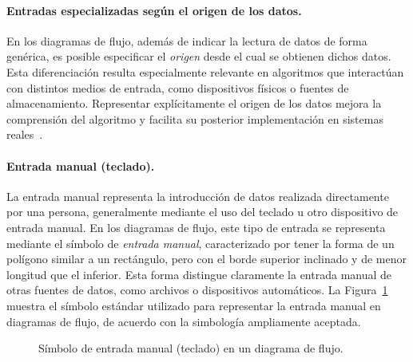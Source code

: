\documentclass[12pt,twoside]{book}
\begin{document}
						\paragraph{Entradas especializadas según el origen de los datos.}
						En los diagramas de flujo, además de indicar la lectura de datos de forma genérica, es posible especificar el \textit{origen} desde el cual se obtienen dichos datos. Esta diferenciación resulta especialmente relevante en algoritmos que interactúan con distintos medios de entrada, como dispositivos físicos o fuentes de almacenamiento. Representar explícitamente el origen de los datos mejora la comprensión del algoritmo y facilita su posterior implementación en sistemas reales~\cite{Manzano2017Programacion,Pressman2019Software}.
						
						\paragraph{Entrada manual (teclado).}
						La entrada manual representa la introducción de datos realizada directamente por una persona, generalmente mediante el uso del teclado u otro dispositivo de entrada manual. En los diagramas de flujo, este tipo de entrada se representa mediante el símbolo de \textit{entrada manual}, caracterizado por tener la forma de un polígono similar a un rectángulo, pero con el borde superior inclinado y de menor longitud que el inferior. Esta forma distingue claramente la entrada manual de otras fuentes de datos, como archivos o dispositivos automáticos. La Figura~\ref{fig:EntradaManual} muestra el símbolo estándar utilizado para representar la entrada manual en diagramas de flujo, de acuerdo con la simbología ampliamente aceptada.
						
						\begin{figure}[hbt!]
							\centering
							\caption{Símbolo de entrada manual (teclado) en un diagrama de flujo.}
							\label{fig:EntradaManual}
						\end{figure}
						
						
\end{document}

